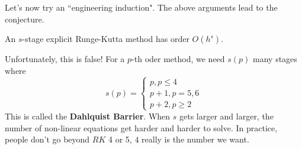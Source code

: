 \documentclass{article}
\begin{document}
\begin{remark}
Let's now try an ``engineering induction". The above arguments lead to the conjecture.
\begin{conjecture}
    An $s$-stage explicit Runge-Kutta method has order $O(h^s)$.
\end{conjecture}
Unfortunately, this is false! For a $p$-th oder method, we need $s(p)$ many stages where 
\[s(p) = \begin{cases}
    p, p \leq 4\\
    p + 1, p = 5, 6\\
    p + 2, p \geq 2
\end{cases}\]
This is called the \textbf{Dahlquist Barrier}. When $s$ gets larger and larger, the number of non-linear equations get harder and harder to solve. In practice, people don't go beyond $RK$ 4 or 5, $4$ really is the number we want.     
\end{remark}
\end{document}
